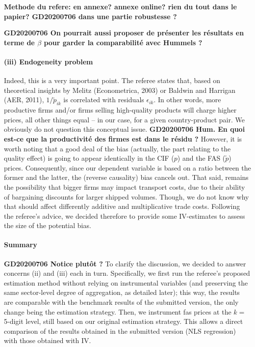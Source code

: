 \documentclass[a4paper,12pt]{article}
\begin{document}
\textbf{Methode du refere: en annexe? annexe online? rien du tout dans le papier? GD20200706 dans une partie robustesse ?}

\textbf{GD20200706 On pourrait aussi proposer de présenter les résultats en terme de $\beta$ pour garder la comparabilité avec Hummels ?}



\paragraph{(iii) Endogeneity problem}

Indeed, this is a very important point. The referee states that, based on theoretical insights by Melitz (Econometrica, 2003) or Baldwin and Harrigan (AER, 2011), $1/\tilde{p}_{ik}$ is correlated with residuals $\epsilon_{ik}$. In other words, more productive firms and/or firms selling high-quality products will charge higher prices, all other things equal – in our case, for a given country-product pair. We obviously do not question this conceptual issue.
\textbf{GD20200706 Hum. En quoi est-ce que la productivité des firmes est dans le résidu ?}
However, it is worth noting that a good deal of the bias (actually, the part relating to the quality effect) is going to appear identically in the CIF ($p$) and the FAS ($\tilde{p}$) prices. Consequently, since our dependent variable is based on a ratio between the former and the latter, the (reverse causality) bias cancels out. That said, remains the possibility that bigger firms may impact transport costs, due to their ability of bargaining discounts for larger shipped volumes. Though, we do not know why that should affect differently additive and multiplicative trade costs. Following the referee's advice, we decided therefore to provide some IV-estimates to assess the size of the potential bias.

\paragraph{Summary} \textbf{GD20200706 Notice plutôt ?} To clarify the discussion, we decided to answer concerns (ii) and (iii) each in turn. Specifically, we first run the referee's proposed estimation method without relying on instrumental variables (and preserving the same sector-level degree of aggregation, as detailed later); this way, the results are comparable with the benchmark results of the submitted version, the only change being the estimation strategy. Then, we instrument fas prices at the $k=$ 5-digit level, still based on our original estimation strategy. This allows a direct comparison of the results obtained in the submitted version (NLS regression) with those obtained with IV.
\end{document}
